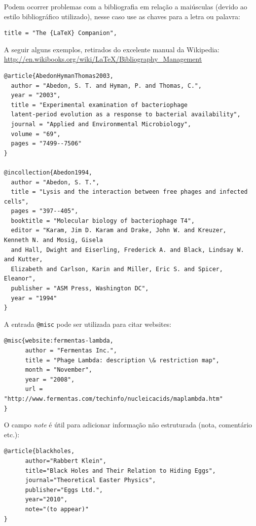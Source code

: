 Podem ocorrer problemas com a bibliografia em relação a maiúsculas (devido ao estilo bibliográfico utilizado), nesse caso use as chaves para a letra ou palavra:

\begin{verbatim}
title = "The {LaTeX} Companion",
\end{verbatim}

A seguir alguns exemplos, retirados do excelente manual da Wikipedia:\\ \url{http://en.wikibooks.org/wiki/LaTeX/Bibliography_Management}

\begin{verbatim}
@article{AbedonHymanThomas2003,
  author = "Abedon, S. T. and Hyman, P. and Thomas, C.",
  year = "2003",
  title = "Experimental examination of bacteriophage
  latent-period evolution as a response to bacterial availability",
  journal = "Applied and Environmental Microbiology",
  volume = "69",
  pages = "7499--7506"
}

@incollection{Abedon1994,
  author = "Abedon, S. T.",
  title = "Lysis and the interaction between free phages and infected cells",
  pages = "397--405",
  booktitle = "Molecular biology of bacteriophage T4",
  editor = "Karam, Jim D. Karam and Drake, John W. and Kreuzer, Kenneth N. and Mosig, Gisela
  and Hall, Dwight and Eiserling, Frederick A. and Black, Lindsay W. and Kutter, 
  Elizabeth and Carlson, Karin and Miller, Eric S. and Spicer, Eleanor",
  publisher = "ASM Press, Washington DC",
  year = "1994"
}
\end{verbatim}

A entrada \verb+@misc+ pode ser utilizada para citar websites:

\begin{verbatim}
@misc{website:fermentas-lambda,
      author = "Fermentas Inc.",
      title = "Phage Lambda: description \& restriction map",
      month = "November",
      year = "2008",
      url = "http://www.fermentas.com/techinfo/nucleicacids/maplambda.htm"
}
\end{verbatim}

O campo \textit{note} é útil para adicionar informação não estruturada (nota, comentário etc.):

\begin{verbatim}
@article{blackholes,
      author="Rabbert Klein",
      title="Black Holes and Their Relation to Hiding Eggs",
      journal="Theoretical Easter Physics",
      publisher="Eggs Ltd.",
      year="2010",
      note="(to appear)"
}
\end{verbatim}

